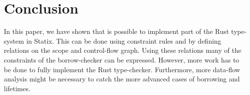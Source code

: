 \section{Conclusion} \label{s:conclusion}
In this paper, we have shown that is possible to implement part of the Rust type-system in Statix. This can be done using constraint rules and by defining relations on the scope and control-flow graph. Using these relations many of the constraints of the borrow-checker can be expressed. However, more work has to be done to fully implement the Rust type-checker. 
Furthermore, more data-flow analysis might be necessary to catch the more advanced cases of borrowing and lifetimes. 